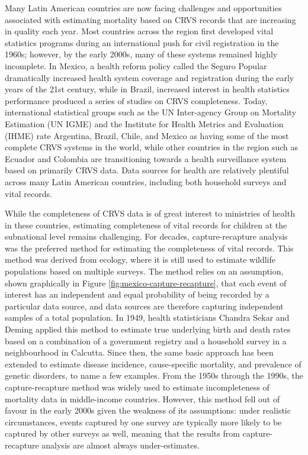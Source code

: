 \documentclass[
]{report}
\begin{document}
Many Latin American countries are now facing challenges and opportunities associated with estimating mortality based on CRVS records that are increasing in quality each year. Most countries across the region first developed vital statistics programs during an international push for civil registration in the 1960s;\autocite{Rao2019} however, by the early 2000s, many of these systems remained highly incomplete.\autocite{Mikkelsen2015} In Mexico, a health reform policy called the Seguro Popular dramatically increased health system coverage and registration during the early years of the 21st century,\autocite{Frenk2006} while in Brazil, increased interest in health statistics performance produced a series of studies on CRVS completeness.\autocite{Schmid2011,DeFrias2013,Szwarcwald2014,Lima2018} Today, international statistical groups such as the UN Inter-agency Group on Mortality Estimation (UN IGME) and the Institute for Health Metrics and Evaluation (IHME) rate Argentina, Brazil, Chile, and Mexico as having some of the most complete CRVS systems in the world,\autocite{UNInter-agencyGrouponMortalityEstimationUNIGME2020,Dicker2018} while other countries in the region such as Ecuador and Colombia are transitioning towards a health surveillance system based on primarily CRVS data.\autocite{Ribotta2019} Data sources for health are relatively plentiful across many Latin American countries, including both household surveys and vital records.

While the completeness of CRVS data is of great interest to ministries of health in these countries, estimating completeness of vital records for children at the subnational level remains challenging. For decades, capture-recapture analysis was the preferred method for estimating the completeness of vital records. This method was derived from ecology, where it is still used to estimate wildlife populations based on multiple surveys.\autocite{Smith1988} The method relies on an assumption, shown graphically in Figure \ref{fig:mexico-capture-recapture}, that each event of interest has an independent and equal probability of being recorded by a particular data source, and data sources are therefore capturing independent samples of a total population. In 1949, health statisticians Chandra Sekar and Deming applied this method to estimate true underlying birth and death rates based on a combination of a government registry and a household survey in a neighbourhood in Calcutta.\autocite{ChandraSekar1949} Since then, the same basic approach has been extended to estimate disease incidence,\autocite{Tilling2001a} cause-specific mortality, and prevalence of genetic disorders, to name a few examples.\autocite{Hook1995} From the 1950s through the 1990s, the capture-recapture method was widely used to estimate incompleteness of mortality data in middle-income countries.\autocite{Yip1995,Becker1996} However, this method fell out of favour in the early 2000s given the weakness of its assumptions: under realistic circumstances, events captured by one survey are typically more likely to be captured by other surveys as well, meaning that the results from capture-recapture analysis are almost always under-estimates.\autocite{Tilling2001,Cormack1999}
\end{document}
